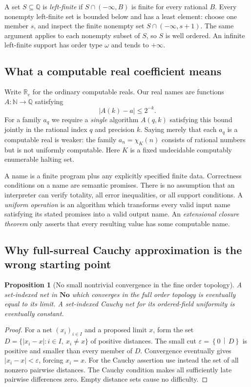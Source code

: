 \documentclass[11pt,letterpaper]{article}
\numberwithin{equation}{section}
\newtheorem{proposition}[theorem]{Proposition}
\theoremstyle{definition}
\theoremstyle{remark}
\newcommand{\No}{\mathbf{No}}
\newcommand{\Rc}{\mathbb R_{\mathrm c}}
\newcommand{\Q}{\mathbb Q}
\newcommand{\N}{\mathbb N}
\newcommand{\cut}[2]{\left\{#1\,\middle|\,#2\right\}}
\begin{document}
A set $S\subseteq\Q$ is \emph{left-finite} if $S\cap(-\infty,B)$ is
finite for every rational $B$. Every nonempty left-finite set is bounded
below and has a least element: choose one member $s$, and inspect the finite
nonempty set $S\cap(-\infty,s+1)$. The same argument applies to each nonempty
subset of $S$, so $S$ is well ordered. An infinite left-finite support has
order type $\omega$ and tends to $+\infty$.

\subsection{What a computable real coefficient means}

Write $\Rc$ for the ordinary computable reals. Our real names are functions
$A:\N\to\Q$ satisfying
\begin{equation}\label{eq:cauchyname}
 |A(k)-a|\le 2^{-k}.
\end{equation}
For a family $a_q$ we require a \emph{single} algorithm $A(q,k)$ satisfying
this bound jointly in the rational index $q$ and precision $k$. Saying
merely that each $a_q$ is a computable real is weaker: the family
$a_n=\chi_K(n)$ consists of rational numbers but is not uniformly computable.
Here $K$ is a fixed undecidable computably enumerable halting set.

A name is a finite program plus any explicitly specified finite data.
Correctness conditions on a name are semantic promises. There is no
assumption that an interpreter can verify totality, all error inequalities,
or all support conditions. A \emph{uniform operation} is an algorithm which
transforms every valid input name satisfying its stated promises into a valid
output name. An \emph{extensional closure theorem} only asserts that every
resulting value has some computable name.

\subsection{Why full-surreal Cauchy approximation is the wrong starting point}

\begin{proposition}[No small nontrivial convergence in the fine order topology]
\label{prop:topology}
A set-indexed net in $\No$ which converges in the full order topology is
eventually equal to its limit. A set-indexed Cauchy net for its ordered-field
uniformity is eventually constant.
\end{proposition}
\begin{proof}
For a net $(x_i)_{i\in I}$ and a proposed limit $x$, form the set
$D=\{|x_i-x|:i\in I,\ x_i\ne x\}$ of positive distances. The small cut
$\varepsilon=\cut 0D$ is positive and smaller than every member of $D$.
Convergence eventually gives $|x_i-x|<\varepsilon$, forcing $x_i=x$.
For the Cauchy assertion use instead the set of all nonzero pairwise
distances. The Cauchy condition makes all sufficiently late pairwise
differences zero. Empty distance sets cause no difficulty.
\end{proof}
\end{document}
